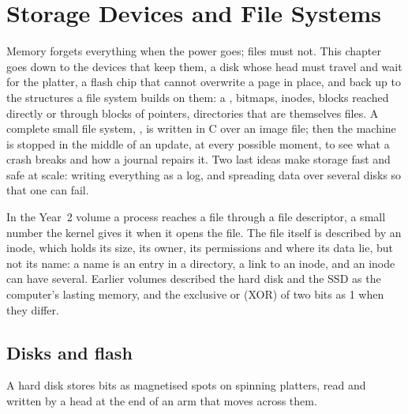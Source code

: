 \chapter{Storage Devices and File Systems}\label{ch:b3:file-systems}

Memory forgets everything when the power goes; files must not. This chapter goes down to the devices that keep them, a disk whose head must travel and wait for the platter, a flash chip that cannot overwrite a page in place, and back up to the structures a file system builds on them: a , bitmaps, inodes, blocks reached directly or through blocks of pointers, directories that are themselves files. A complete small file system, , is written in C over an image file; then the machine is stopped in the middle of an update, at every possible moment, to see what a crash breaks and how a journal repairs it. Two last ideas make storage fast and safe at scale: writing everything as a log, and spreading data over several disks so that one can fail.

\begin{recall}
In the Year~2 volume a process reaches a file through a file descriptor, a small number the kernel gives it when it opens the file. The file itself is described by an inode, which holds its size, its owner, its permissions and where its data lie, but not its name: a name is an entry in a directory, a link to an inode, and an inode can have several. Earlier volumes described the hard disk and the SSD as the computer's lasting memory, and the exclusive or (XOR) of two bits as 1 when they differ.
\end{recall}

\section{Disks and flash}\label{sec:b3:file-systems:devices}

A hard disk stores bits as magnetised spots on spinning platters, read and written by a head at the end of an arm that moves across them.

